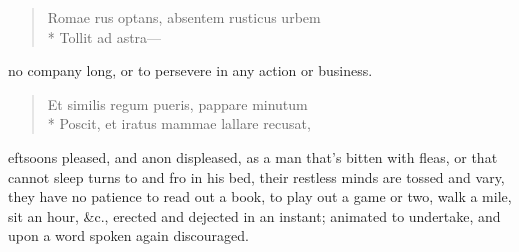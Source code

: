 {\begin{latin}
\begin{verse}%
Romae rus optans, absentem rusticus urbem\\*
Tollit ad astra---
\end{verse}%
\end{latin}

no company long, or to persevere in any action or business.

\begin{latin}
\begin{verse}%
Et similis regum pueris, pappare minutum\\*
Poscit, et iratus mammae lallare recusat,
\end{verse}%
\end{latin}

eftsoons pleased, and anon displeased, as a man that's bitten with
fleas, or that cannot sleep turns to and fro in his bed, their restless
minds are tossed and vary, they have no patience to read out a book, to
play out a game or two, walk a mile, sit an hour, \&c., erected and
dejected in an instant; animated to undertake, and upon a word spoken
again discouraged.

}
